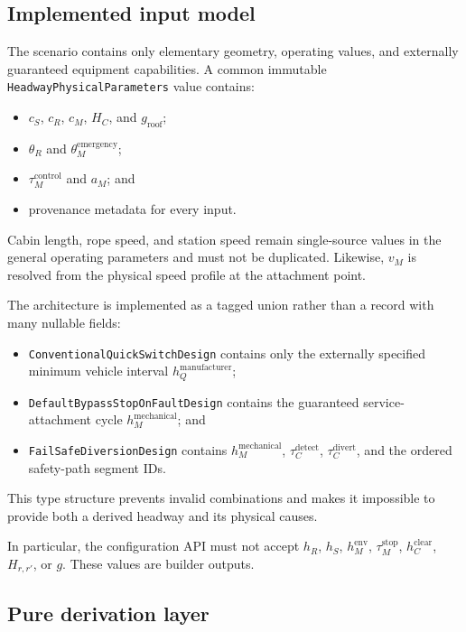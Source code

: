\documentclass[11pt,a4paper]{scrartcl}
\begin{document}
\subsection{Implemented input model}

The scenario contains only elementary geometry, operating values, and
externally guaranteed equipment capabilities.  A common immutable
\texttt{HeadwayPhysicalParameters} value contains:
\begin{itemize}[leftmargin=*]
  \item $c_S$, $c_R$, $c_M$, $H_C$, and $g_{\mathrm{roof}}$;
  \item $\theta_R$ and $\theta_M^{\mathrm{emergency}}$;
  \item $\tau_M^{\mathrm{control}}$ and $a_M$; and
  \item provenance metadata for every input.
\end{itemize}
Cabin length, rope speed, and station speed remain single-source values in the
general operating parameters and must not be duplicated.  Likewise, $v_M$ is
resolved from the physical speed profile at the attachment point.

The architecture is implemented as a tagged union rather than a record with many nullable
fields:
\begin{itemize}[leftmargin=*]
  \item \texttt{ConventionalQuickSwitchDesign} contains only the externally
    specified minimum vehicle interval $h_Q^{\mathrm{manufacturer}}$;
  \item \texttt{DefaultBypassStopOnFaultDesign} contains the guaranteed
    service-attachment cycle $h_M^{\mathrm{mechanical}}$; and
  \item \texttt{FailSafeDiversionDesign} contains
    $h_M^{\mathrm{mechanical}}$, $\tau_C^{\mathrm{detect}}$,
    $\tau_C^{\mathrm{divert}}$, and the ordered safety-path segment IDs.
\end{itemize}
This type structure prevents invalid combinations and makes it impossible to
provide both a derived headway and its physical causes.

In particular, the configuration API must not accept $h_R$, $h_S$,
$h_M^{\mathrm{env}}$, $\tau_M^{\mathrm{stop}}$, $h_C^{\mathrm{clear}}$,
$H_{r,r'}$, or $g$.  These values are builder outputs.

\subsection{Pure derivation layer}
\end{document}
